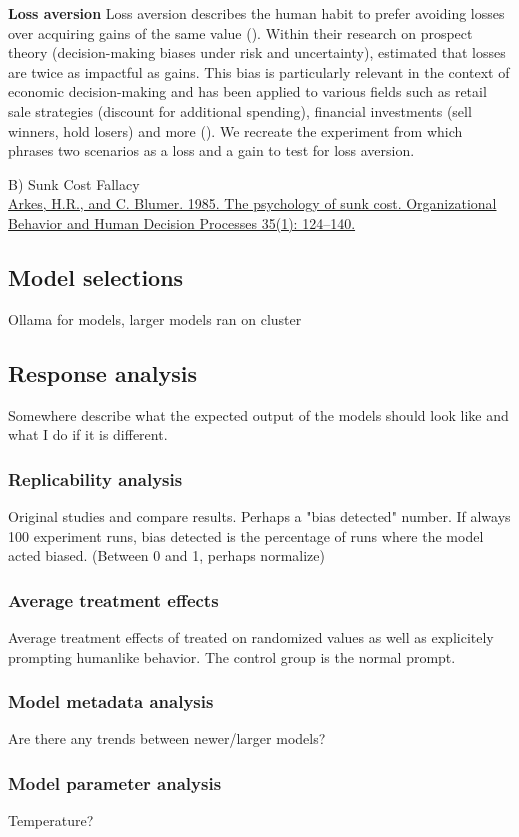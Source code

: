 \par \textbf{Loss aversion} Loss aversion describes the human habit to prefer avoiding losses over acquiring gains of the same value  (\cite{liu2023review}). Within their research on prospect theory (decision-making biases under risk and uncertainty), \cite{tversky1992advances} estimated that losses are twice as impactful as gains. This bias is particularly relevant in the context of economic decision-making and has been applied to various fields such as retail sale strategies (discount for additional spending), financial investments (sell winners, hold losers) and more (\cite{liu2023review}). We recreate the experiment from \cite{thaler2015misbehaving} which phrases two scenarios as a loss and a gain to test for loss aversion.

B) Sunk Cost Fallacy \\
\href{http://www.communicationcache.com/uploads/1/0/8/8/10887248/the_psychology_of_sunk_cost.pdf}{Arkes, H.R., and C. Blumer. 1985. The psychology of sunk cost. Organizational Behavior and Human Decision Processes 35(1): 124–140.} \\

\subsection{Model selections}
Ollama for models, larger models ran on cluster


\subsection{Response analysis}
Somewhere describe what the expected output of the models should look like and what I do if it is different.

\subsubsection{Replicability analysis}
Original studies and compare results. Perhaps a "bias detected" number. If always 100 experiment runs, bias detected is the percentage of runs where the model acted biased. (Between 0 and 1, perhaps normalize)

\subsubsection{Average treatment effects}
Average treatment effects of treated on randomized values as well as explicitely prompting humanlike behavior. The control group is the normal prompt.

\subsubsection{Model metadata analysis}
Are there any trends between newer/larger models?

\subsubsection{Model parameter analysis}
Temperature?